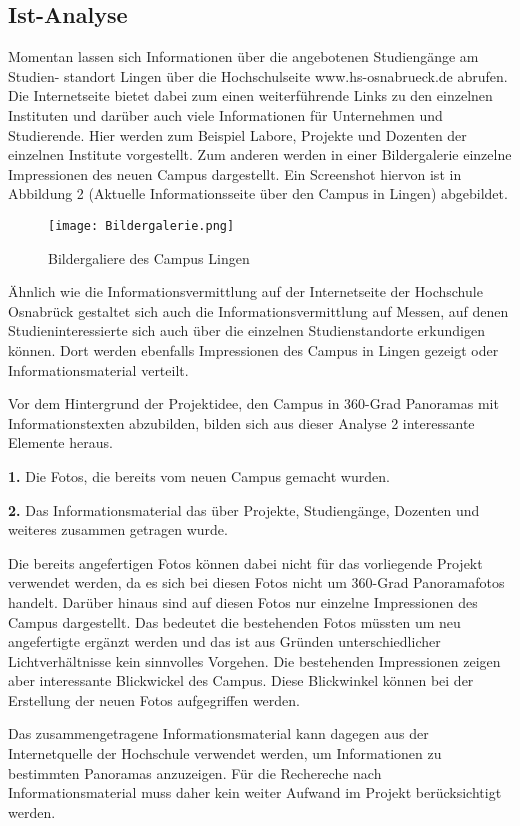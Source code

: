 \subsection{Ist-Analyse}
\label{sec:IstAnalyse}

Momentan lassen sich Informationen über die angebotenen Studiengänge am Studien-
standort Lingen über die Hochschulseite www.hs-osnabrueck.de abrufen. Die Internetseite bietet dabei zum einen 
weiterführende Links zu den einzelnen Instituten und darüber auch viele Informationen für Unternehmen und Studierende.
Hier werden zum Beispiel Labore, Projekte und Dozenten der einzelnen Institute vorgestellt. Zum anderen werden in einer 
Bildergalerie einzelne Impressionen des neuen Campus dargestellt. Ein Screenshot hiervon ist in Abbildung 2 (Aktuelle 
Informationsseite über den Campus in Lingen) abgebildet.

\begin{figure}[htb]
\centering
\texttt{[image: Bildergalerie.png]}
\caption[Campus Lingen Bildergalerie]{Bildergaliere des Campus Lingen\protect\footnotemark}
\label{fig:Architektur}
\end{figure}

Ähnlich wie die Informationsvermittlung auf der Internetseite der Hochschule Osnabrück
gestaltet sich auch die Informationsvermittlung auf Messen, auf denen Studieninteressierte
sich auch über die einzelnen Studienstandorte erkundigen können. Dort werden ebenfalls
Impressionen des Campus in Lingen gezeigt oder Informationsmaterial verteilt.

Vor dem Hintergrund der Projektidee, den Campus in 360-Grad Panoramas mit Informationstexten abzubilden, bilden sich aus 
dieser Analyse 2 interessante Elemente heraus.

\textbf{1.} Die Fotos, die bereits vom neuen Campus gemacht wurden.

\textbf{2.} Das Informationsmaterial das über Projekte, Studiengänge, Dozenten und weiteres zusammen getragen wurde.

Die bereits angefertigen Fotos können dabei nicht für das vorliegende Projekt verwendet werden, da es sich bei diesen 
Fotos nicht um 360-Grad Panoramafotos handelt. Darüber hinaus sind auf diesen Fotos nur einzelne Impressionen des Campus 
dargestellt. Das bedeutet die bestehenden Fotos müssten um neu angefertigte ergänzt werden und das ist aus Gründen 
unterschiedlicher Lichtverhältnisse kein sinnvolles Vorgehen. Die bestehenden Impressionen zeigen aber
interessante Blickwickel des Campus. Diese Blickwinkel können bei der Erstellung der neuen Fotos aufgegriffen werden. 

Das zusammengetragene Informationsmaterial kann dagegen aus der Internetquelle der Hochschule verwendet werden, um 
Informationen zu bestimmten Panoramas anzuzeigen. Für die Rechereche nach Informationsmaterial muss daher kein weiter 
Aufwand im Projekt berücksichtigt werden.